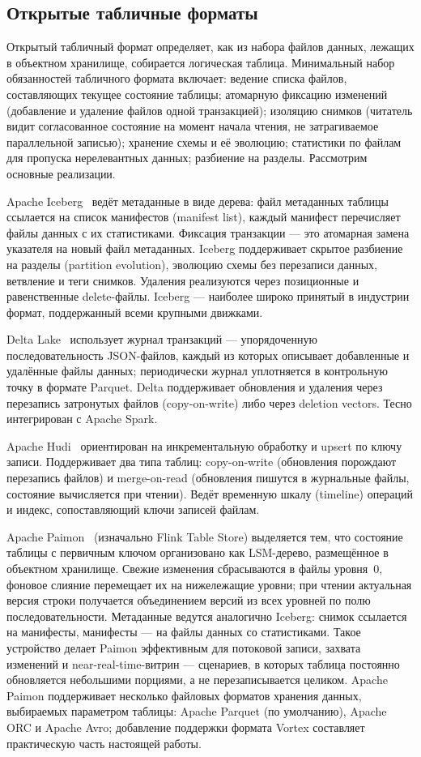 \subsection{Открытые табличные форматы}

Открытый табличный формат определяет, как из набора файлов данных, лежащих в
объектном хранилище, собирается логическая таблица. Минимальный набор обязанностей
табличного формата включает: ведение списка файлов, составляющих текущее состояние
таблицы; атомарную фиксацию изменений (добавление и удаление файлов одной
транзакцией); изоляцию снимков (читатель видит согласованное состояние на момент
начала чтения, не затрагиваемое параллельной записью); хранение схемы и её
эволюцию; статистики по файлам для пропуска нерелевантных данных; разбиение на
разделы. Рассмотрим основные реализации.

Apache Iceberg~\cite{iceberg-spec} ведёт метаданные в виде дерева: файл метаданных таблицы
ссылается на список манифестов (manifest list), каждый манифест перечисляет файлы
данных с их статистиками. Фиксация транзакции --- это атомарная замена указателя на
новый файл метаданных. Iceberg поддерживает скрытое разбиение на разделы (partition
evolution), эволюцию схемы без перезаписи данных, ветвление и теги снимков. Удаления
реализуются через позиционные и равенственные delete-файлы. Iceberg --- наиболее
широко принятый в индустрии формат, поддержанный всеми крупными движками.

Delta Lake~\cite{armbrust2020delta} использует журнал транзакций --- упорядоченную последовательность
JSON-файлов, каждый из которых описывает добавленные и удалённые файлы данных;
периодически журнал уплотняется в контрольную точку в формате Parquet. Delta
поддерживает обновления и удаления через перезапись затронутых файлов
(copy-on-write) либо через deletion vectors. Тесно интегрирован с Apache Spark.

Apache Hudi~\cite{hudi-docs} ориентирован на инкрементальную обработку и upsert по ключу
записи. Поддерживает два типа таблиц: copy-on-write (обновления порождают перезапись
файлов) и merge-on-read (обновления пишутся в журнальные файлы, состояние
вычисляется при чтении). Ведёт временную шкалу (timeline) операций и индекс,
сопоставляющий ключи записей файлам.

Apache Paimon~\cite{paimon-docs} (изначально Flink Table Store) выделяется тем, что состояние
таблицы с первичным ключом организовано как LSM-дерево, размещённое в объектном
хранилище. Свежие изменения сбрасываются в файлы уровня~0, фоновое слияние
перемещает их на нижележащие уровни; при чтении актуальная версия строки получается
объединением версий из всех уровней по полю последовательности. Метаданные ведутся
аналогично Iceberg: снимок ссылается на манифесты, манифесты --- на файлы данных со
статистиками. Такое устройство делает Paimon эффективным для потоковой записи,
захвата изменений и near-real-time-витрин --- сценариев, в которых таблица
постоянно обновляется небольшими порциями, а не перезаписывается целиком. Apache
Paimon поддерживает несколько файловых форматов хранения данных, выбираемых
параметром таблицы: Apache Parquet (по умолчанию), Apache ORC и Apache Avro;
добавление поддержки формата Vortex составляет практическую часть настоящей работы.

